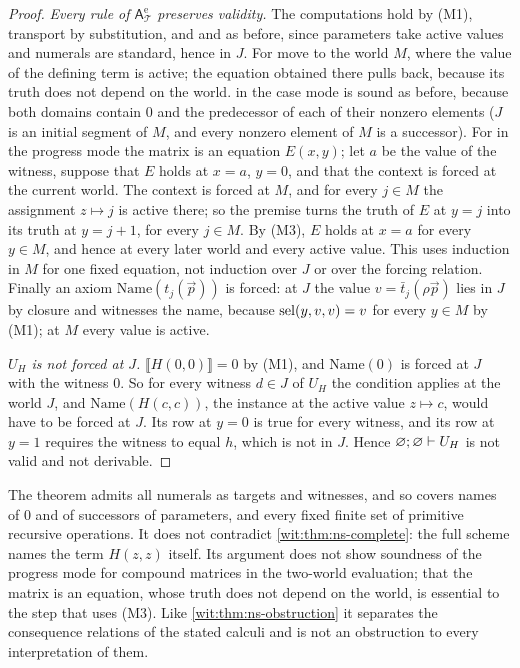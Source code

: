 \begin{proof}
\emph{Every rule of $\mathsf{A}^{\mathrm e}_{\mathcal T}$ preserves
validity.}  The computations hold by (M1), transport by substitution, and
 and  as before, since parameters take active
values and numerals are standard, hence in $J$.  For  move
to the world $M$, where the value of the defining term is active; the equation
obtained there pulls back, because its truth does not depend on the world.
 in the case mode is sound as before, because both domains
contain $0$ and the predecessor of each of their nonzero elements ($J$ is an
initial segment of $M$, and every nonzero element of $M$ is a successor).
For  in the progress mode the matrix is an equation $E(x,y)$;
let $a$ be the value of the witness, suppose that $E$ holds at $x=a$, $y=0$,
and that the context is forced at the current world.  The context is forced at
$M$, and for every $j\in M$ the assignment $z\mapsto j$ is active there; so
the premise turns the truth of $E$ at $y=j$ into its truth at $y=j+1$, for
every $j\in M$.  By (M3), $E$ holds at $x=a$ for every $y\in M$, and hence at
every later world and every active value.  This uses induction in $M$ for one
fixed equation, not induction over $J$ or over the forcing relation.  Finally
an axiom $\mathrm{Name}(t_j(\vec p))$ is forced: at $J$ the value
$v=\bar t_j(\rho\vec p)$ lies in $J$ by closure and witnesses the name,
because $\operatorname{sel}(y,v,v)=v$ for every $y\in M$ by (M1); at $M$ every value is
active.

\emph{$U_H$ is not forced at $J$.}  $\llbracket H(0,0)\rrbracket=0$ by (M1),
and $\mathrm{Name}(0)$ is forced at $J$ with the witness $0$.  So for every
witness $d\in J$ of $U_H$ the condition applies at the world $J$, and
$\mathrm{Name}(H(c,c))$, the instance at the active value $z\mapsto c$, would
have to be forced at $J$.  Its row at $y=0$ is true for every witness, and its
row at $y=1$ requires the witness to equal $h$, which is not in $J$.  Hence
$\varnothing;\varnothing\vdash U_H$ is not valid and not derivable.
\end{proof}

\begin{remark}
\label{wit:rem:ns-templates}
The theorem admits all numerals as targets and witnesses, and so covers
names of $0$ and of successors of parameters, and every fixed finite set of
primitive recursive operations.  It does not contradict
\cref{wit:thm:ns-complete}: the full scheme names the term $H(z,z)$ itself.
Its argument does not show soundness of the progress mode for compound
matrices in the two-world evaluation; that the matrix is an equation, whose
truth does not depend on the world, is essential to the step that uses (M3).
Like \cref{wit:thm:ns-obstruction} it separates the consequence relations of
the stated calculi and is not an obstruction to every interpretation of them.
\end{remark}

